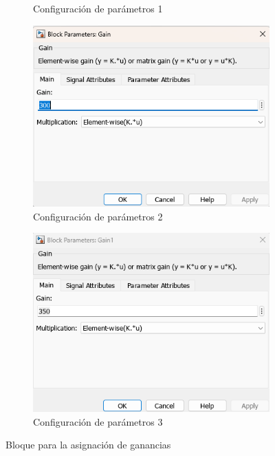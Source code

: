 \begin{figure}[htbp]
\begin{subfigure}[b]{0.45\textwidth}
        \caption{Configuración de parámetros 1}
        \label{fig:parametros_gain_01}
    \end{subfigure}
    \hfill
    \begin{subfigure}[b]{0.45\textwidth}
        \centering
        \includegraphics[width=\textwidth]{fig/Capitulo5/Caso_de_estudio_PID/config_gain_300.png}
        \caption{Configuración de parámetros 2}
        \label{fig:parametros_gain_02}
    \end{subfigure}
    \hfill
    \begin{subfigure}[b]{0.45\textwidth}
        \centering
        \includegraphics[width=\textwidth]{fig/Capitulo5/Caso_de_estudio_PID/config_gain_350.png}
        \caption{Configuración de parámetros 3}
        \label{fig:parametros_gain_03}
    \end{subfigure}

    \caption{Bloque para la asignación de ganancias}
    \label{fig:arreglo_gain}
\end{figure}


